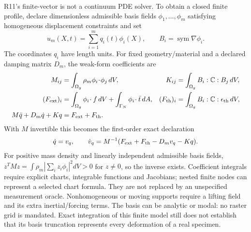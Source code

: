 R11's finite-vector  is not a continuum PDE solver. To obtain a
closed finite profile, declare dimensionless admissible basis fields
$\phi_1,\ldots,\phi_m$ satisfying homogeneous displacement constraints and set
\begin{equation}
 u_m(X,t)=\sum_{i=1}^m q_i(t)\phi_i(X),\qquad
 B_i=\operatorname{sym}\nabla\phi_i .
\end{equation}
The coordinates $q_i$ have length units. For fixed geometry/material and a
declared damping matrix $D_m$, the weak-form coefficients are
\begin{align}
 M_{ij}&=\int_{\Omega_g}\rho_m\phi_i\!\cdot\!\phi_j\,dV,
 &K_{ij}&=\int_{\Omega_g}B_i:\mathbb C:B_j\,dV,\\
 (F_{\rm ext})_i&=\int_{\Omega_g}\phi_i\!\cdot f\,dV
                  +\int_{\Gamma_N}\phi_i\!\cdot\bar t\,dA,
 &(F_{\rm th})_i&=\int_{\Omega_g}B_i:\mathbb C:\epsilon_{\rm th}\,dV,\\
 M\ddot q+D_m\dot q+Kq&=F_{\rm ext}+F_{\rm th}.&&
\end{align}
With $M$ invertible this becomes the first-order exact declaration
\begin{equation}
 \dot q=v_q,\qquad
 \dot v_q=M^{-1}(F_{\rm ext}+F_{\rm th}-D_mv_q-Kq).
\end{equation}
For positive mass density and linearly independent admissible basis fields,
$z^TMz=\int\rho_m|\sum_i z_i\phi_i|^2dV>0$ for $z\ne0$, so the inverse
exists. Coefficient integrals require explicit charts, integrable functions
and Jacobians; nested finite  nodes can represent a selected
chart formula. They are not replaced by an unspecified measurement oracle.
Nonhomogeneous or moving supports require a lifting field and its extra
inertial/forcing terms. The basis can be analytic or modal: no raster grid is
mandated. Exact integration of this finite model still does not establish
that its basis truncation represents every deformation of a real specimen.


